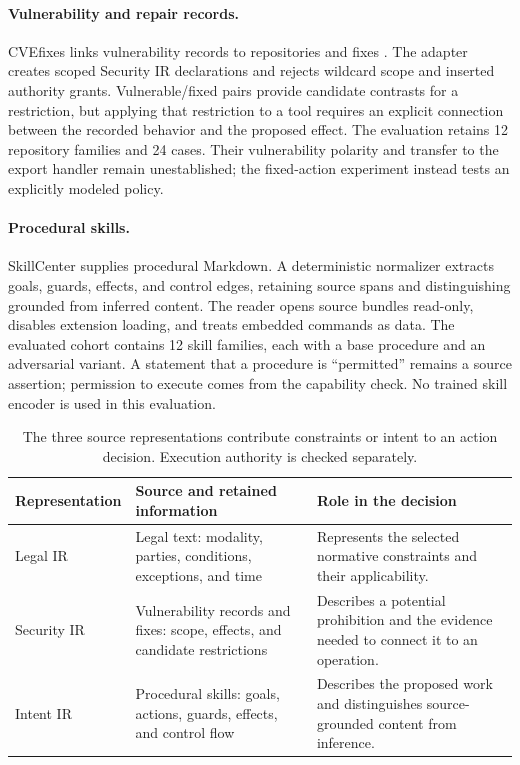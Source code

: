 \documentclass{article}
\begin{document}
\paragraph{Vulnerability and repair records.}
CVEfixes links vulnerability records to repositories and fixes \citep{cvefixes}. The adapter creates scoped Security IR declarations and rejects wildcard scope and inserted authority grants. Vulnerable/fixed pairs provide candidate contrasts for a restriction, but applying that restriction to a tool requires an explicit connection between the recorded behavior and the proposed effect. The evaluation retains 12 repository families and 24 cases. Their vulnerability polarity and transfer to the export handler remain unestablished; the fixed-action experiment instead tests an explicitly modeled policy.

\paragraph{Procedural skills.}
SkillCenter supplies procedural Markdown. A deterministic normalizer extracts goals, guards, effects, and control edges, retaining source spans and distinguishing grounded from inferred content. The reader opens source bundles read-only, disables extension loading, and treats embedded commands as data. The evaluated cohort contains 12 skill families, each with a base procedure and an adversarial variant. A statement that a procedure is ``permitted'' remains a source assertion; permission to execute comes from the capability check. No trained skill encoder is used in this evaluation.

\begin{table}[t]
\centering
\caption{The three source representations contribute constraints or intent to an action decision. Execution authority is checked separately.}
\label{tab:1}
\begin{tabular}{@{}>{\raggedright\arraybackslash}p{.18\linewidth} >{\raggedright\arraybackslash}p{.36\linewidth} >{\raggedright\arraybackslash}p{.40\linewidth}@{}}
\toprule
Representation & Source and retained information & Role in the decision \\
\midrule
Legal IR & Legal text: modality, parties, conditions, exceptions, and time & Represents the selected normative constraints and their applicability. \\[4pt]
Security IR & Vulnerability records and fixes: scope, effects, and candidate restrictions & Describes a potential prohibition and the evidence needed to connect it to an operation. \\[4pt]
Intent IR & Procedural skills: goals, actions, guards, effects, and control flow & Describes the proposed work and distinguishes source-grounded content from inference. \\
\bottomrule
\end{tabular}
\end{table}
\end{document}
